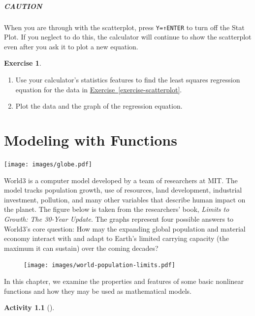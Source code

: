 \documentclass[10pt,]{book}
\theoremstyle{plain}
\theoremstyle{definition}
\theoremstyle{definition}
\theoremstyle{definition}
\theoremstyle{definition}
\newtheorem{activity}[project]{Activity}
\theoremstyle{definition}
\newtheorem{exercise}[theorem]{Exercise}
\numberwithin{equation}{section}
\begin{document}
\paragraph[CAUTION]{CAUTION}\label{paragraphs-18}

        When you are through with the scatterplot, press \lstinline?Y=?\lstinline?↑?\lstinline?ENTER? to turn off the Stat Plot. If you neglect to do this, the calculator will continue to show the scatterplot even after you ask it to plot a new equation.
\begin{exercise}\label{exercise-GC-regression}
\leavevmode%
\begin{enumerate}[label=*\alph**]
\item\hypertarget{li-216}{}
            Use your calculator’s statistics features to find the least squares regression equation for the data in \hyperref[exercise-scatterplot]{Exercise~\ref{exercise-scatterplot}}.
        \item\hypertarget{li-217}{}
            Plot the data and the graph of the regression equation.
        \end{enumerate}
\end{exercise}
\typeout{************************************************}
\typeout{************************************************}
\chapter[Modeling with Functions]{Modeling with Functions}\label{chap2}
\typeout{************************************************}
\typeout{************************************************}
\texttt{[image: images/globe.pdf]}%
\par
World3 is a computer model developed by a team of researchers at MIT. The model tracks population growth, use of resources, land development, industrial investment, pollution, and many other variables that describe human impact on the planet. The figure below is taken from the researchers' book, \emph{Limits to Growth: The 30-Year Update}. The graphs represent four possible answers to World3's core question: How may the expanding global population and material economy interact with and adapt to Earth's limited carrying capacity (the maximum it can sustain) over the coming decades?%
\leavevmode%
\begin{figure}
\centering
\texttt{[image: images/world-population-limits.pdf]}\end{figure}
\par
In this chapter, we examine the properties and features of some basic nonlinear functions and how they may be used as mathematical models.%
\begin{activity}[]\label{activity-1}
\end{activity}
\typeout{************************************************}
\typeout{************************************************}
\end{document}
